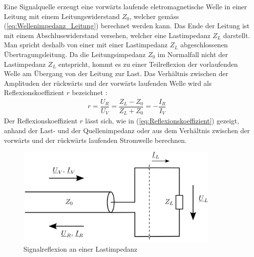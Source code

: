 Eine Signalquelle erzeugt eine vorwärts laufende eletromagnetische Welle in einer Leitung mit einem Leitungswiderstand $Z_0$, welcher gemäss (\ref{eq:Wellenimpedanz_Leitung}) berechnet werden kann. Das Ende der Leitung ist mit einem Abschlusswiderstand versehen, welcher eine Lastimpedanz $Z_L$ darstellt. Man spricht deshalb von einer mit einer Lastimpedanz $Z_L$ abgeschlossenen Übertragungsleitung. Da die Leitungsimpedanz $Z_0$ im Normalfall nicht der Lastimpedanz $Z_L$ entspricht, kommt es zu einer   Teilreflexion der vorlaufenden Welle am Übergang von der Leitung zur Last. Das Verhältnis zwischen der Amplituden der rückwärts und der vorwärts laufenden Welle wird als Reflexionskoeffizient $r$ bezeichnet \cite{Tekom}: \\
\begin{eqnarray}\label{eq:Reflexionskoeffizient}
r=\dfrac{U_{R}}{U_{V}}=\dfrac{Z_{L}-Z_{0}}{Z_{L}+Z_{0}}=-\dfrac{I_{R}}{I_{V}}
\end{eqnarray}
Der Reflexionskoeffizient $r$ lässt sich, wie in (\ref{eq:Reflexionskoeffizient}) gezeigt, anhand der Last- und der Quellenimpedanz oder aus dem Verhältnis zwischen der vorwärts und der rückwärts laufenden Stromwelle berechnen.

\begin{figure}[!ht]
	\centering
	\includegraphics[width=10cm]{content/bilder/ReflexionenLeitungLastimpedanz.pdf}%
	\caption{Signalreflexion an einer Lastimpedanz \cite{Tekom}}
	\label{LeitungMit_ZL}
\end{figure}


